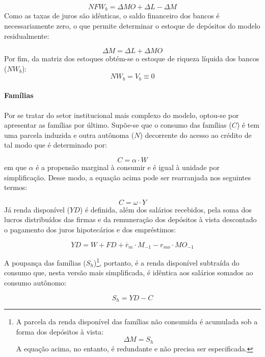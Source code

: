 $$
NFW_b = \Delta MO + \Delta L - \Delta M
$$
Como as taxas de juros são idênticas, o saldo financeiro dos bancos é necessariamente zero, o que permite determinar o estoque de depósitos do modelo residualmente:

\begin{equation}
\label{_M}
    \Delta M = \Delta L + \Delta MO
\end{equation}
Por fim, da matriz dos estoques obtém-se o estoque de riqueza líquida dos bancos ($NW_b$):
\begin{equation}
    NW_b = V_b \equiv 0
\end{equation}

\paragraph*{Famílias} 
Por se tratar do setor institucional mais complexo do modelo, optou-se por apresentar as famílias por último. Supõe-se que o consumo das famílias ($C$) é tem uma parcela induzida e outra autônoma ($N$) decorrente do acesso ao crédito de tal modo que é determinado por:

\begin{equation}
\label{_C}
    C = \alpha\cdot W
\end{equation}
em que $\alpha$ é a propensão marginal à consumir e é igual à unidade por simplificação. Desse modo, a equação acima pode ser rearranjada nos seguintes termos:

$$
C = \omega\cdot Y
$$
Já renda disponível ($YD$) é definida, além dos salários recebidos, pela soma dos lucros distribuídos das firmas e da remuneração dos depósitos à vista descontado o pagamento dos juros hipotecários e dos empréstimos:

\begin{equation}
    \label{EqYD}
    YD = W + FD + \overline r_m\cdot M_{-1} - r_{mo}\cdot MO_{-1}
\end{equation}

A poupança das famílias ($S_h$)\footnote{
A parcela da renda disponível das famílias não consumida é acumulada sob a forma dos depósitos à vista:
$$
\Delta M = S_h
$$
A equação acima, no entanto, é redundante e não precisa ser especificada.}, portanto, é a renda disponível subtraída do consumo que, nesta versão mais simplificada, é idêntica aos salários somados ao consumo autônomo:

\begin{equation}
    \label{EqSh}
    S_h = YD - C
\end{equation}

